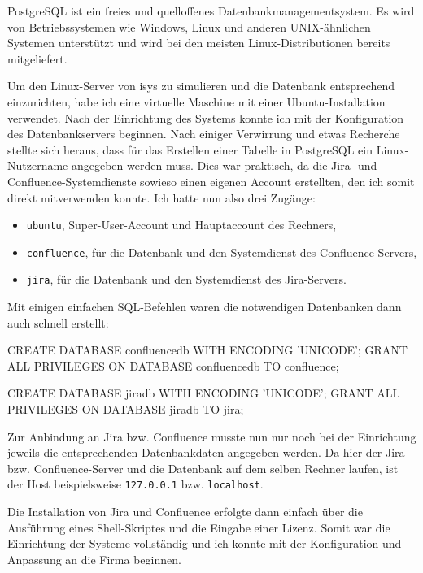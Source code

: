 \documentclass[xcolor=dvipsnames,11pt,paper=a4paper]{report}
\begin{document}
PostgreSQL ist ein freies und quelloffenes Datenbankmanagementsystem. Es wird von
Betriebssystemen wie Windows, Linux und anderen UNIX-ähnlichen Systemen unterstützt
und wird bei den meisten Linux-Distributionen bereits mitgeliefert.

Um den Linux-Server von isys zu simulieren und die Datenbank entsprechend einzurichten,
habe ich eine virtuelle Maschine mit einer Ubuntu-Installation verwendet. Nach der
Einrichtung des Systems konnte ich mit der Konfiguration des Datenbankservers beginnen.
Nach einiger Verwirrung und etwas Recherche stellte sich heraus, dass für das Erstellen
einer Tabelle in PostgreSQL ein Linux-Nutzername angegeben werden muss. Dies war
praktisch, da die Jira- und Confluence-Systemdienste sowieso einen eigenen Account
erstellten, den ich somit direkt mitverwenden konnte. Ich hatte nun also drei Zugänge:

\begin{itemize}
	\item \texttt{ubuntu}, Super-User-Account und Hauptaccount des Rechners,
	\item \texttt{confluence}, für die Datenbank und den Systemdienst des Confluence-Servers,
	\item \texttt{jira}, für die Datenbank und den Systemdienst des Jira-Servers.
\end{itemize}

Mit einigen einfachen SQL-Befehlen waren die notwendigen Datenbanken dann auch schnell
erstellt:

\begin{code}[language=SQL, caption={SQL-Befehle zur Erstellung der Datenbanken}]
CREATE DATABASE confluencedb WITH ENCODING 'UNICODE';
GRANT ALL PRIVILEGES ON DATABASE confluencedb TO confluence;

CREATE DATABASE jiradb WITH ENCODING 'UNICODE';
GRANT ALL PRIVILEGES ON DATABASE jiradb TO jira;
\end{code}

Zur Anbindung an Jira bzw. Confluence musste nun nur noch bei der Einrichtung jeweils
die entsprechenden Datenbankdaten angegeben werden. Da hier der Jira- bzw. Confluence-Server
und die Datenbank auf dem selben Rechner laufen, ist der Host beispielsweise \texttt{127.0.0.1}
bzw. \texttt{localhost}.

Die Installation von Jira und Confluence erfolgte dann einfach über die Ausführung
eines Shell-Skriptes und die Eingabe einer Lizenz. Somit war die Einrichtung der
Systeme vollständig und ich konnte mit der Konfiguration und Anpassung an die Firma
beginnen.
\end{document}
